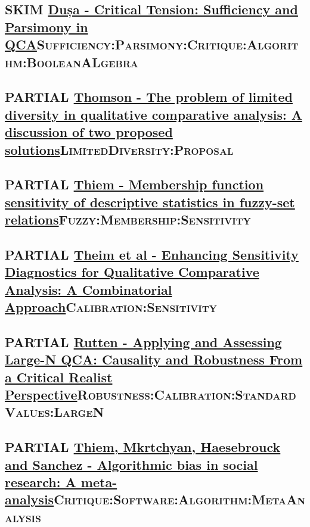 \documentclass[11pt]{article}
\begin{document}
\subsection*{{\bfseries\sffamily SKIM} \href{https://doi.org/10.1177\%2F0049124119882456}{Dușa - Critical Tension: Sufficiency and Parsimony in QCA}\hfill{}\textsc{Sufficiency:Parsimony:Critique:Algorithm:BooleanALgebra}}
\label{sec:org45b1414}


\subsection*{{\bfseries\sffamily PARTIAL} \href{https://doi.org/10.5172/mra.2011.5.2.254}{Thomson - The problem of limited diversity in qualitative comparative analysis: A discussion of two proposed solutions}\hfill{}\textsc{LimitedDiversity:Proposal}}
\label{sec:org434571a}

\subsection*{{\bfseries\sffamily PARTIAL} \href{https://doi.org/10.1080/13645579.2013.806118}{Thiem - Membership function sensitivity of descriptive statistics in fuzzy-set relations}\hfill{}\textsc{Fuzzy:Membership:Sensitivity}}
\label{sec:orgaeddd64}
\subsection*{{\bfseries\sffamily PARTIAL} \href{https://doi.org/10.1093/pan/mpv028}{Theim et al - Enhancing Sensitivity Diagnostics for Qualitative Comparative Analysis: A Combinatorial Approach}\hfill{}\textsc{Calibration:Sensitivity}}
\label{sec:org05745cc}

\subsection*{{\bfseries\sffamily PARTIAL} \href{https://doi.org/10.1177\%2F0049124120914955}{Rutten - Applying and Assessing Large-N QCA: Causality and Robustness From a Critical Realist Perspective}\hfill{}\textsc{Robustness:Calibration:StandardValues:LargeN}}
\label{sec:orgfbf46c3}

\subsection*{{\bfseries\sffamily PARTIAL} \href{https://doi.org/10.1371/journal.pone.0233625}{Thiem, Mkrtchyan, Haesebrouck and Sanchez - Algorithmic bias in social research: A meta-analysis}\hfill{}\textsc{Critique:Software:Algorithm:MetaAnalysis}}
\label{sec:org278a2f0}
\end{document}
